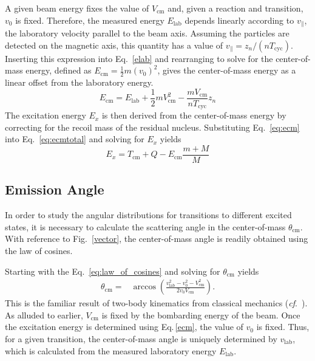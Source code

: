 A given beam energy fixes the value of $V_\mathrm{cm}$ and, given a reaction and transition, $v_{0}$ is fixed.  Therefore, the measured energy $E_\mathrm{lab}$ depends linearly according to $v_\parallel$, the laboratory velocity parallel to the beam axis.  Assuming the particles are detected on the magnetic axis, this quantity has a value of $v_\parallel=z_n/(n T_\mathrm{cyc})$.  Inserting this expression into Eq.~\ref{elab} and   rearranging to solve for the center-of-mass energy, defined as $E_\mathrm{cm}=\frac{1}{2}m( v_0)^2$, gives the center-of-mass energy as a linear offset from the laboratory energy. 
\begin{equation}
E_\mathrm{cm}=E_\mathrm{lab}+\frac{1}{2} mV_\mathrm{cm}^2-\frac{m V_\mathrm{cm}}{n T_\mathrm{cyc}}z_n
\label{ecm}
\end{equation}
The excitation energy $E_x$ is then derived from the center-of-mass energy by correcting for the recoil mass of the residual nucleus. Substituting Eq.~\ref{eq:ecm} into Eq.~\ref{eq:ecmtotal} and solving for $E_x$ yields
\begin{equation}
E_x=T_\mathrm{cm}+Q-E_\mathrm{cm}\frac{m+M}{M}
\label{eq:recoil_mass}
\end{equation}

\subsection{Emission Angle}
In order to study the angular distributions for transitions to different excited states, it is necessary to calculate the scattering angle in the center-of-mass $\theta_\mathrm{cm}$.  With reference to Fig.~\ref{vector}, the center-of-mass angle is readily obtained using the law of cosines.

Starting with the %
Eq.~\ref{eq:law_of_cosines} and solving for $\theta_\mathrm{cm}$ yields
\begin{equation}
\begin{split}
\theta_\mathrm{cm}=&\arccos\left(\frac{v_\mathrm{lab}^2-v_0^2-V_\mathrm{cm}^2}{2v_0 V_\mathrm{cm}}\right).
\end{split}
\label{costhetacm}
\end{equation}
This is the familiar result of two-body kinematics from classical mechanics (\textit{cf}.~\citet[Eq.~3.109]{Goldstein_2002}).
As alluded to earlier, $V_\mathrm{cm}$ is fixed by the bombarding energy of the beam.  Once the excitation energy is determined using Eq.\,\ref{ecm}, the value of $v_0$ is fixed.  Thus, for a given transition, the center-of-mass angle is uniquely determined by $v_\mathrm{lab}$, which is calculated from the measured laboratory energy $E_\mathrm{lab}$.  

